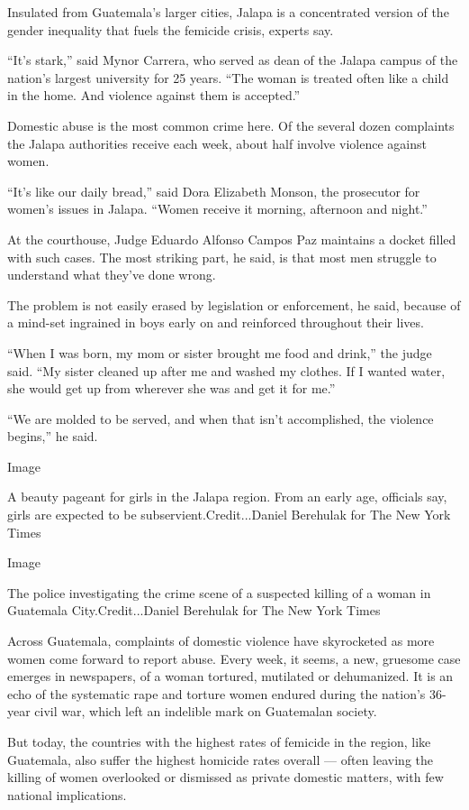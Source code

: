 Insulated from Guatemala's larger cities, Jalapa is a concentrated
version of the gender inequality that fuels the femicide crisis, experts
say.

``It's stark,'' said Mynor Carrera, who served as dean of the Jalapa
campus of the nation's largest university for 25 years. ``The woman is
treated often like a child in the home. And violence against them is
accepted.''

Domestic abuse is the most common crime here. Of the several dozen
complaints the Jalapa authorities receive each week, about half involve
violence against women.

``It's like our daily bread,'' said Dora Elizabeth Monson, the
prosecutor for women's issues in Jalapa. ``Women receive it morning,
afternoon and night.''

At the courthouse, Judge Eduardo Alfonso Campos Paz maintains a docket
filled with such cases. The most striking part, he said, is that most
men struggle to understand what they've done wrong.

The problem is not easily erased by legislation or enforcement, he said,
because of a mind-set ingrained in boys early on and reinforced
throughout their lives.

``When I was born, my mom or sister brought me food and drink,'' the
judge said. ``My sister cleaned up after me and washed my clothes. If I
wanted water, she would get up from wherever she was and get it for
me.''

``We are molded to be served, and when that isn't accomplished, the
violence begins,'' he said.

Image

A beauty pageant for girls in the Jalapa region. From an early age,
officials say, girls are expected to be subservient.Credit...Daniel
Berehulak for The New York Times

Image

The police investigating the crime scene of a suspected killing of a
woman in Guatemala City.Credit...Daniel Berehulak for The New York Times

Across Guatemala, complaints of domestic violence have skyrocketed as
more women come forward to report abuse. Every week, it seems, a new,
gruesome case emerges in newspapers, of a woman tortured, mutilated or
dehumanized. It is an echo of the systematic rape and torture women
endured during the nation's 36-year civil war, which left an indelible
mark on Guatemalan society.

But today, the countries with the highest rates of femicide in the
region, like Guatemala, also suffer the highest homicide rates overall
--- often leaving the killing of women overlooked or dismissed as
private domestic matters, with few national implications.

